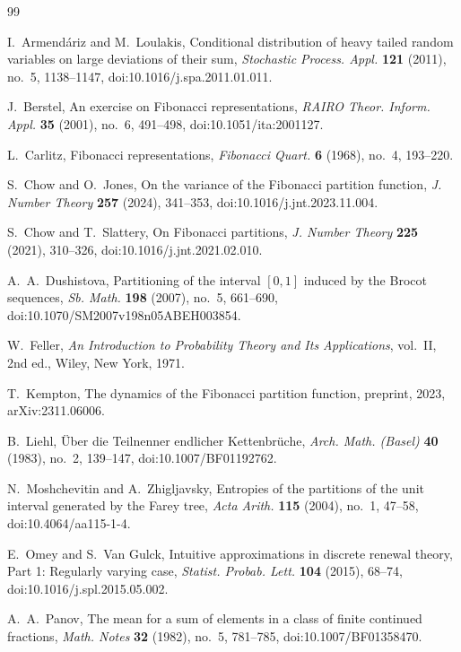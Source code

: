 \begin{thebibliography}{99}

I.~Armend\'ariz and M.~Loulakis,
Conditional distribution of heavy tailed random variables on large
deviations of their sum,
\textit{Stochastic Process. Appl.} \textbf{121} (2011), no.~5, 1138--1147,
doi:10.1016/j.spa.2011.01.011.

J.~Berstel,
An exercise on Fibonacci representations,
\textit{RAIRO Theor. Inform. Appl.} \textbf{35} (2001), no.~6, 491--498,
doi:10.1051/ita:2001127.

L.~Carlitz,
Fibonacci representations,
\textit{Fibonacci Quart.} \textbf{6} (1968), no.~4, 193--220.

S.~Chow and O.~Jones,
On the variance of the Fibonacci partition function,
\textit{J. Number Theory} \textbf{257} (2024), 341--353,
doi:10.1016/j.jnt.2023.11.004.

S.~Chow and T.~Slattery,
On Fibonacci partitions,
\textit{J. Number Theory} \textbf{225} (2021), 310--326,
doi:10.1016/j.jnt.2021.02.010.

A.~A.~Dushistova,
Partitioning of the interval \([0,1]\) induced by the Brocot sequences,
\textit{Sb. Math.} \textbf{198} (2007), no.~5, 661--690,
doi:10.1070/SM2007v198n05ABEH003854.

W.~Feller,
\textit{An Introduction to Probability Theory and Its Applications}, vol.~II,
2nd ed., Wiley, New York, 1971.

T.~Kempton,
The dynamics of the Fibonacci partition function,
preprint, 2023, arXiv:2311.06006.

B.~Liehl,
\"Uber die Teilnenner endlicher Kettenbr\"uche,
\textit{Arch. Math. (Basel)} \textbf{40} (1983), no.~2, 139--147,
doi:10.1007/BF01192762.

N.~Moshchevitin and A.~Zhigljavsky,
Entropies of the partitions of the unit interval generated by the Farey tree,
\textit{Acta Arith.} \textbf{115} (2004), no.~1, 47--58,
doi:10.4064/aa115-1-4.

E.~Omey and S.~Van Gulck,
Intuitive approximations in discrete renewal theory, Part 1: Regularly
varying case,
\textit{Statist. Probab. Lett.} \textbf{104} (2015), 68--74,
doi:10.1016/j.spl.2015.05.002.

A.~A.~Panov,
The mean for a sum of elements in a class of finite continued fractions,
\textit{Math. Notes} \textbf{32} (1982), no.~5, 781--785,
doi:10.1007/BF01358470.


\end{thebibliography}
